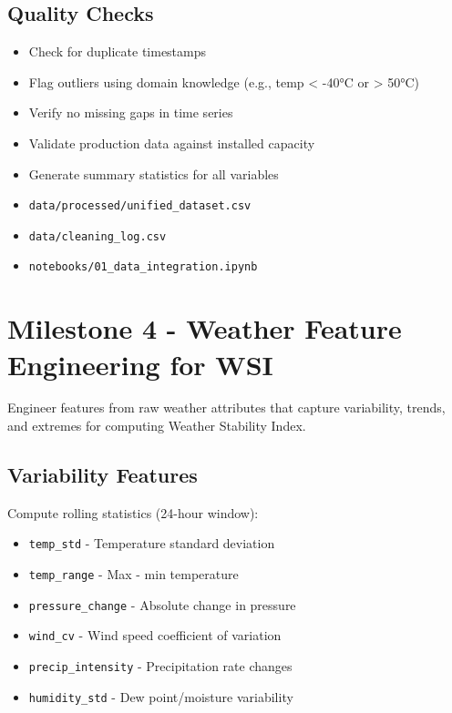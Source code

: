 \documentclass[11pt,a4paper]{article}
\begin{document}
\subsection{Quality Checks}

\begin{checkbox}
\begin{itemize}
    \item Check for duplicate timestamps
    \item Flag outliers using domain knowledge (e.g., temp < -40°C or > 50°C)
    \item Verify no missing gaps in time series
    \item Validate production data against installed capacity
    \item Generate summary statistics for all variables
\end{itemize}
\end{checkbox}

\begin{deliverablebox}
\begin{itemize}
    \item \texttt{data/processed/unified\_dataset.csv}
    \item \texttt{data/cleaning\_log.csv}
    \item \texttt{notebooks/01\_data\_integration.ipynb}
\end{itemize}
\end{deliverablebox}

\section{Milestone 4 - Weather Feature Engineering for WSI}

\begin{objectivebox}
Engineer features from raw weather attributes that capture variability, trends, and extremes for computing Weather Stability Index.
\end{objectivebox}

\subsection{Variability Features}

Compute rolling statistics (24-hour window):
\begin{itemize}
    \item \texttt{temp\_std} - Temperature standard deviation
    \item \texttt{temp\_range} - Max - min temperature
    \item \texttt{pressure\_change} - Absolute change in pressure
    \item \texttt{wind\_cv} - Wind speed coefficient of variation
    \item \texttt{precip\_intensity} - Precipitation rate changes
    \item \texttt{humidity\_std} - Dew point/moisture variability
\end{itemize}
\end{document}
